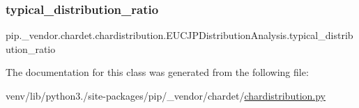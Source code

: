 \subsubsection{\texorpdfstring{typical\+\_\+distribution\+\_\+ratio}{typical\_distribution\_ratio}}
{\footnotesize\ttfamily pip.\+\_\+vendor.\+chardet.\+chardistribution.\+E\+U\+C\+J\+P\+Distribution\+Analysis.\+typical\+\_\+distribution\+\_\+ratio}



The documentation for this class was generated from the following file\+:\begin{DoxyCompactItemize}
\item 
venv/lib/python3./site-\/packages/pip/\+\_\+vendor/chardet/\hyperlink{chardistribution_8py}{chardistribution.\+py}\end{DoxyCompactItemize}
